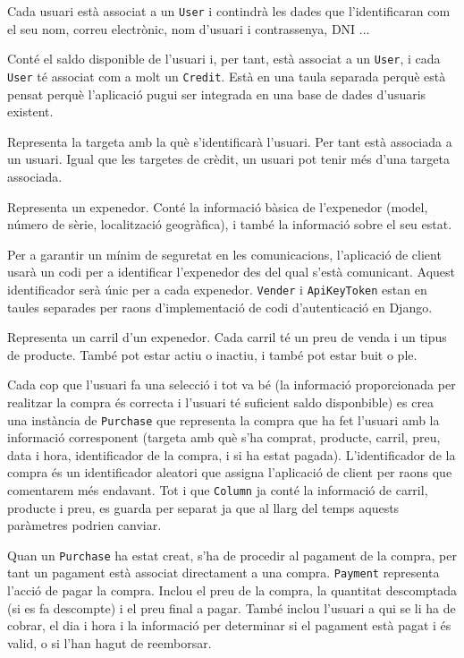 \begin{description}[font=\normalfont\textbf]\itemsep2pt 
\vspace{-1em}
\parskip1pt 

\item[User] Cada usuari està associat a un \texttt{User} i contindrà les dades que l'identificaran com el seu nom, correu electrònic, nom d'usuari i contrassenya, DNI ...
\item[Credit] Conté el saldo disponible de l'usuari i, per tant, està associat a un \texttt{User}, i cada \texttt{User} té associat com a molt un \texttt{Credit}. Està en una taula separada perquè està pensat perquè l'aplicació pugui ser integrada en una base de dades d'usuaris existent.
\item[Card] Representa la targeta amb la què s'identificarà l'usuari. Per tant està associada a un usuari. Igual que les targetes de crèdit, un usuari pot tenir més d'una targeta associada.
\item[Vender] Representa un expenedor. Conté la informació bàsica de l'expenedor (model, número de sèrie, localització geogràfica), i també la informació sobre el seu estat.
\item[ApiKeyToken] Per a garantir un mínim de seguretat en les comunicacions, l'aplicació de client usarà un codi per a identificar l'expenedor des del qual s'està comunicant. Aquest identificador serà únic per a cada expenedor. \texttt{Vender} i \texttt{ApiKeyToken} estan en taules separades per raons d'implementació de codi d'autenticació en Django.
\item[Column] Representa un carril d'un expenedor. Cada carril té un preu de venda i un tipus de producte. També pot estar actiu o inactiu, i també pot estar buit o ple.
\item[Purchase] Cada cop que l'usuari fa una selecció i tot va bé (la informació proporcionada per realitzar la compra és correcta i l'usuari té suficient saldo disponbible) es crea una instància de \texttt{Purchase} que representa la compra que ha fet l'usuari amb la informació corresponent (targeta amb què s'ha comprat, producte, carril, preu, data i hora, identificador de la compra, i si ha estat pagada). L'identificador de la compra és un identificador aleatori que assigna l'aplicació de client per raons que comentarem més endavant. Tot i que \texttt{Column} ja conté la informació de carril, producte i preu, es guarda per separat ja que al llarg del temps aquests paràmetres podrien canviar.
\item[Payment] Quan un \texttt{Purchase} ha estat creat, s'ha de procedir al pagament de la compra, per tant un pagament està associat directament a una compra. \texttt{Payment} representa l'acció de pagar la compra. Inclou el preu de la compra, la quantitat descomptada (si es fa descompte) i el preu final a pagar. També inclou l'usuari a qui se li ha de cobrar, el dia i hora i la informació per determinar si el pagament està pagat i és valid, o si l'han hagut de reemborsar.

\end{description}
